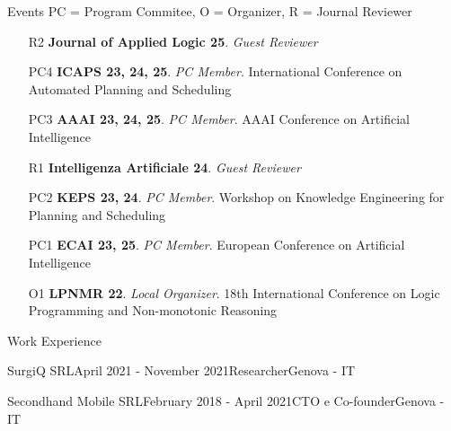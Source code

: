\documentclass{resume} %
\begin{document}
\begin{rSection}{Events {\tiny PC = Program Commitee, O = Organizer, R = Journal Reviewer}} 
\begin{enumerate}[leftmargin=5mm]
\item[R2] \textbf{Journal of Applied Logic 25}. \textit{Guest Reviewer} 
\item[PC4] \textbf{ICAPS 23, 24, 25}. \textit{PC Member}. International Conference on Automated Planning and Scheduling 
\item[PC3] \textbf{AAAI 23, 24, 25}. \textit{PC Member}. AAAI Conference on Artificial Intelligence 
\item[R1] \textbf{Intelligenza Artificiale 24}. \textit{Guest Reviewer} 
\item[PC2]\textbf{KEPS 23, 24}. \textit{PC Member}. Workshop on Knowledge Engineering for Planning and Scheduling 
\item[PC1] \textbf{ECAI 23, 25}. \textit{PC Member}. European Conference on Artificial Intelligence 
\item[O1] \textbf{LPNMR 22}. \textit{Local Organizer}. 18th International Conference on Logic Programming and Non-monotonic Reasoning  
\end{enumerate}
\end{rSection}


%
%
%

\begin{rSection}{Work Experience}


\begin{rSubsection}{SurgiQ SRL}{April 2021 - November 2021}{Researcher}{Genova - IT}
\end{rSubsection}
\begin{rSubsection}{Secondhand Mobile SRL}{February 2018 - April 2021}{CTO e Co-founder}{Genova - IT}
\end{rSubsection}




\end{rSection}



\end{document}
